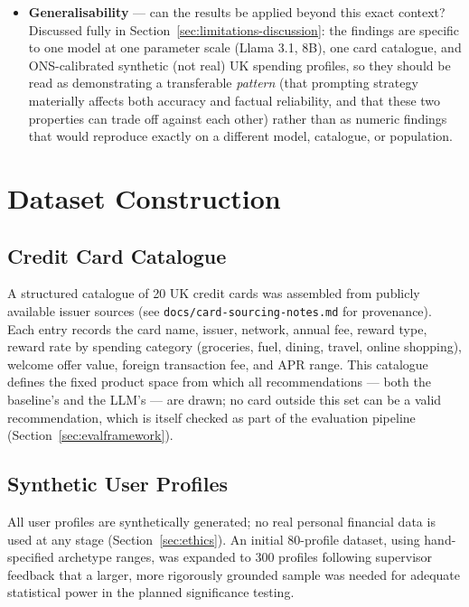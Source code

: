 \begin{itemize}
    \item \textbf{Generalisability} --- can the results be applied beyond this exact context? Discussed fully in Section~\ref{sec:limitations-discussion}: the findings are specific to one model at one parameter scale (Llama 3.1, 8B), one card catalogue, and ONS-calibrated synthetic (not real) UK spending profiles, so they should be read as demonstrating a transferable \textit{pattern} (that prompting strategy materially affects both accuracy and factual reliability, and that these two properties can trade off against each other) rather than as numeric findings that would reproduce exactly on a different model, catalogue, or population.
\end{itemize}

\section{Dataset Construction}

\subsection{Credit Card Catalogue}

A structured catalogue of 20 UK credit cards was assembled from publicly available issuer sources (see \texttt{docs/card-sourcing-notes.md} for provenance). Each entry records the card name, issuer, network, annual fee, reward type, reward rate by spending category (groceries, fuel, dining, travel, online shopping), welcome offer value, foreign transaction fee, and APR range. This catalogue defines the fixed product space from which all recommendations --- both the baseline's and the LLM's --- are drawn; no card outside this set can be a valid recommendation, which is itself checked as part of the evaluation pipeline (Section~\ref{sec:evalframework}).

\subsection{Synthetic User Profiles}
\label{sec:profile-archetypes}

All user profiles are synthetically generated; no real personal financial data is used at any stage (Section~\ref{sec:ethics}). An initial 80-profile dataset, using hand-specified archetype ranges, was expanded to 300 profiles following supervisor feedback that a larger, more rigorously grounded sample was needed for adequate statistical power in the planned significance testing.

